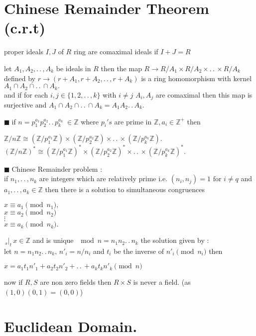 \documentclass[11pt]{extarticle}
\newcommand{\ra}{\rightarrow}
\newcommand{\Z}{\mathbb{Z}}
\newcommand{\w}[1]{\text{#1}}
\newcommand{\ck}{.\,.\,}
\newcommand{\tm}{\times}
\newcommand{\snote}[1]{{\footnotesize(#1)}}
\newcommand{\st}{\,{}_{s}|_t\,}
\newcommand{\tbx}[2][]{
	\begin{tcolorbox}[enhanced,breakable,size=small,colback=black!2!white,title={#1},arc is angular, arc=1.5mm,drop fuzzy shadow]
		#2
	\end{tcolorbox}
}
\newcommand{\y}{$\blacksquare\;$}
\begin{document}
\begin{multicols}{2}
		\section{Chinese Remainder Theorem (c.r.t)}

\tbx{proper ideals $ I,J $ of $ R $ ring are comaximal ideals if $ I+J=R $
			} 
\tbx[c.r.t]{ let $ A_1,A_2,\ck , A_k $ be ideals in $ R $ then the map 
			$ R \ra R/A_1 \tm R/A_2 \tm \ck \tm R/A_k $ defined by $ r \ra (r+A_1,r+A_2,\ck , r+A_k) $ is a 
			ring homomorphism with kernel $ A_1\cap A_2 \cap \ck \cap A_k. $\\
			and if for each $ i,j \in \{1,2,\ck , k\} $ with $ i\neq j $ $ A_i,A_j $ are comaximal then this 
			map is surjective and  $ A_1\cap A_2 \cap \ck \cap A_k=A_1A_2\ck A_k. $ 
			} 
\tbx[Consequences of c.r.t]{
			\y if $ n=p_1^{a_1}p_2^{a_2}\ck p_k^{a_k} \; \in \Z $ where $ p_i's$ are prime in $ \Z, a_i\in  
			\Z^+ $ then 
			\begin{center}
				$ \Z/n\Z \cong (\Z/p_1^{a_1}\Z)\tm (\Z/p_2^{a_2}\Z)\tm \ck \tm (\Z/p_k^{a_k}\Z). $
				$ (\Z/n\Z)^* \cong (\Z/p_1^{a_1}\Z)^*\tm (\Z/p_2^{a_2}\Z)^*\tm \ck \tm (\Z/p_k^{a_k}\Z)^*. $
			\end{center}
			
			\y Chinese Remainder problem : \\
			if $ n_1,\ck ,n_k $ are integers which are relatively prime i.e. $ (n_i,n_j)=1 \w{ for } i\neq q$
			and $ a_1,\ck , a_k \in \Z $  then there is a solution to simultaneous congruences 
			\begin{center}
				$ x\equiv a_1 \pmod{n_1},$\\
				$x\equiv a_2\pmod{n_2} $\\
				$\vdots$\\
				$ x\equiv a_k\pmod{n_k}  .$
			\end{center} $ \st x\in \Z $ and is unique $ \mod n=n_1n_2\ck n_k $
			the solution given by :\\
			let $n=n_1n_2\ck n_k , \, n'_i=n/n_i$ and $ t_i $  be the inverse of $ n'_i \pmod{n_i }$ then
			\begin{center}
				$ x=a_1t_1n'_1+a_2t_2n'_2+\ck +a_kt_kn'_k \pmod n $
			\end{center}
			} 
\tbx{now if $ R,S $ are non zero fields then $ R\tm S $ is never a field. \snote{as $ (1,0)(0,1)=(0,0) $}}
		
		\section{Euclidean Domain.}


\end{multicols}
\end{document}

